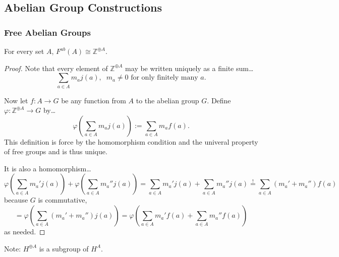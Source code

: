 \subsection{Abelian Group Constructions}\label{abeliangroupconstructions}

\subsubsection{Free Abelian Groups}\label{freeabeliangroups}

\begin{proposition}
For every set $A$, $F^{ab}(A) \cong \mathbb{Z}^{\oplus A}$.
\end{proposition}

\begin{proof}
Note that every element of $\mathbb{Z}^{\oplus A}$ may be written uniquely as a finite sum\dots
$$\sum_{a \in A} m_a j(a), \; \; m_a \neq 0 \textrm{ for only finitely many } a.$$

Now let $f : A \rightarrow G$ be any function from $A$ to the abelian group $G$. Define 
$\varphi : \mathbb{Z}^{\oplus A} \rightarrow G$ by\dots
$$\varphi(\sum_{a \in A}m_a j(a)) := \sum_{a \in A}m_a f(a).$$
This definition is force by the homomorphism condition and the univeral property of free groups and is thus unique.

It is also a homomorphism\dots
$$\varphi(\sum_{a \in A}m_a' j(a)) + \varphi(\sum_{a \in A}m_a'' j(a)) = \sum_{a \in A}m_a' j(a) + \sum_{a \in A}m_a'' j(a) \overset{!}{=} \sum_{a \in A}(m_a' + m_a'')f(a)$$
because $G$ is commutative,
$$= \varphi(\sum_{a \in A}(m_a' + m_a'')j(a)) = \varphi(\sum_{a \in A}m_a' f(a) + \sum_{a \in A}m_a'' f(a))$$
as needed.
\end{proof}

\noindent Note: $H^{\oplus A}$ is a subgroup of $H^A$.
